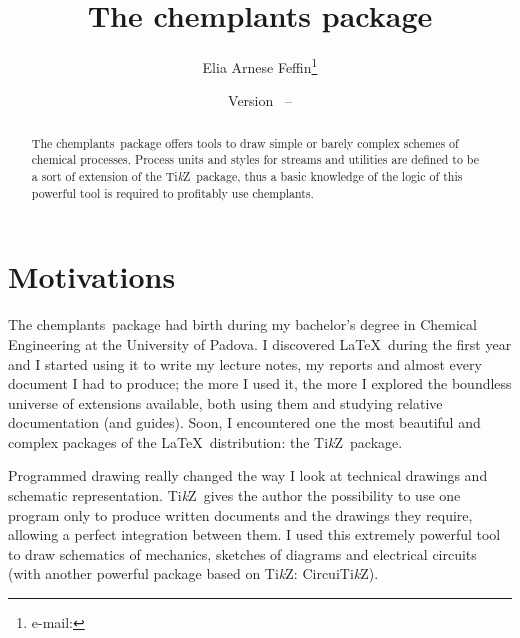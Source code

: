 \documentclass[12pt]{article}						%
\title{The chemplants package}
\author{Elia Arnese Feffin\footnote{e-mail: \mail{elia24913@me.com}}}
\date{Version \chpversion\ -- \chpdate}
\newcommand*{\chemplants}{chemplants}
\newcommand*{\TikZ}{Ti\textit{k}Z}
\newcommand*{\CircuiTikZ}{Circui\TikZ}
\begin{document}



\maketitle											%

\begin{abstract}
The \chemplants\ package offers tools to draw simple or barely complex schemes of
chemical processes. Process units and styles for streams and utilities are
defined to be a sort of extension of the \TikZ\ package, thus a basic knowledge
of the logic of this powerful tool is required to profitably use \chemplants.
\end{abstract}



\tableofcontents									%


\section{Motivations}

The \chemplants\ package had birth during my bachelor's degree in Chemical
Engineering at the University of Padova. I discovered \LaTeX\ during the first
year and I started using it to write my lecture notes, my reports and almost
every document I had to produce; the more I used it, the more I explored the
boundless universe of extensions available, both using them and studying relative
documentation (and guides). Soon, I encountered one the most beautiful and
complex packages of the \LaTeX\ distribution: the \TikZ\ package.

Programmed drawing really changed the way I look at technical drawings and
schematic representation. \TikZ\ gives the author the possibility to use one
program only to produce written documents and the drawings they require, allowing
a perfect integration between them. I used this extremely powerful tool to draw
schematics of mechanics, sketches of diagrams and electrical circuits (with
another powerful package based on \TikZ: \CircuiTikZ).
\end{document}
